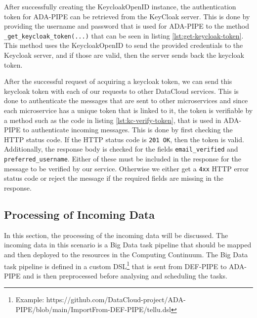 \documentclass{article}
\begin{document}
            
            After successfully creating the KeycloakOpenID instance, the authentication token for ADA-PIPE can be retrieved from the KeyCloak server. This is done by providing the username and password that is used for ADA-PIPE to the method \texttt{\_get\_keycloak\_token(...)} that can be seen in listing \ref{lst:get-keycloak-token}. This method uses the KeycloakOpenID to send the provided credentials to the Keycloak server, and if those are valid, then the server sends back the keycloak token.
            
            
            After the successful request of acquiring a keycloak token, we can send this keycloak token with each of our requests to other DataCloud services. This is done to authenticate the messages that are sent to other microservices and since each microservice has a unique token that is linked to it, the token is verifiable by a method such as the code in listing \ref{lst:kc-verify-token}, that is used in ADA-PIPE to authenticate incoming messages. This is done by first checking the HTTP status code. If the HTTP status code is \texttt{201 OK}, then the token is valid. Additionally, the response body is checked for the fields \texttt{email\_verified} and \texttt{preferred\_username}. Either of these must be included in the response for the message to be verified by our service. Otherwise we either get a \texttt{4xx} HTTP error status code or reject the message if the required fields are missing in the response.

            


        \subsection{Processing of Incoming Data}

            In this section, the processing of the incoming data will be discussed.
            The incoming data in this scenario is a Big Data task pipeline that should be mapped and then deployed to the resources in the Computing Continuum. The Big Data task pipeline is defined in a custom DSL\footnote{Example: https://github.com/DataCloud-project/ADA-PIPE/blob/main/ImportFrom-DEF-PIPE/tellu.dsl} that is sent from DEF-PIPE to ADA-PIPE and is then preprocessed before analysing and scheduling the tasks. 
\end{document}
